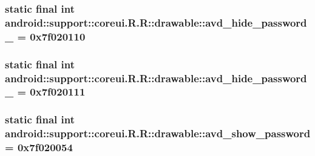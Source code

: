 \hypertarget{classandroid_1_1support_1_1coreui_1_1_r_1_1drawable_338fb7736dae9768308657c92da989ce}{
\subsubsection[{avd\_\-hide\_\-password\_\-2}]{\setlength{\rightskip}{0pt plus 5cm}static final int android::support::coreui.R.R::drawable::avd\_\-hide\_\-password\_ = 0x7f020110}}
\label{classandroid_1_1support_1_1coreui_1_1_r_1_1drawable_338fb7736dae9768308657c92da989ce}


\hypertarget{classandroid_1_1support_1_1coreui_1_1_r_1_1drawable_218e9d236d94b514228e761e30a57f84}{
\subsubsection[{avd\_\-hide\_\-password\_\-3}]{\setlength{\rightskip}{0pt plus 5cm}static final int android::support::coreui.R.R::drawable::avd\_\-hide\_\-password\_ = 0x7f020111}}
\label{classandroid_1_1support_1_1coreui_1_1_r_1_1drawable_218e9d236d94b514228e761e30a57f84}


\hypertarget{classandroid_1_1support_1_1coreui_1_1_r_1_1drawable_f008a1249662dbbc9b4ac0e0aaaa30f6}{
\subsubsection[{avd\_\-show\_\-password}]{\setlength{\rightskip}{0pt plus 5cm}static final int android::support::coreui.R.R::drawable::avd\_\-show\_\-password = 0x7f020054}}
\label{classandroid_1_1support_1_1coreui_1_1_r_1_1drawable_f008a1249662dbbc9b4ac0e0aaaa30f6}


